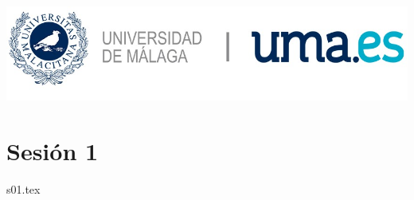 \documentclass[12pt, a4paper]{article}
\begin{document}
\begin{titlepage}
\vspace*{\fill}

\vspace*{\fill}

\includegraphics[scale=0.25]{Logo_UMA.jpg}

\vspace*{\fill}
\end{titlepage}


\section{Sesión 1}

{s01.tex}
\end{document}
